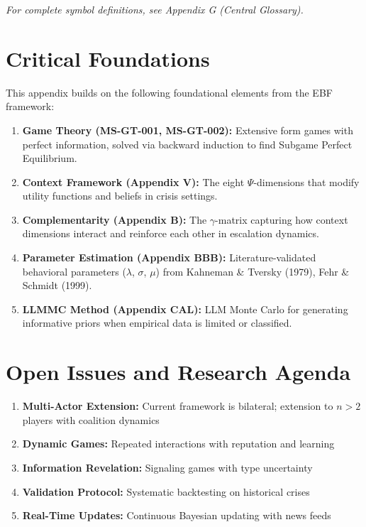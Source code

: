 \vspace{5mm}
\textit{For complete symbol definitions, see Appendix G (Central Glossary).}



\section{Critical Foundations}
\label{sec:crisis-foundations}

This appendix builds on the following foundational elements from the EBF framework:

\begin{enumerate}
\item \textbf{Game Theory (MS-GT-001, MS-GT-002):} Extensive form games with perfect information, solved via backward induction to find Subgame Perfect Equilibrium.

\item \textbf{Context Framework (Appendix V):} The eight $\Psi$-dimensions that modify utility functions and beliefs in crisis settings.

\item \textbf{Complementarity (Appendix B):} The $\gamma$-matrix capturing how context dimensions interact and reinforce each other in escalation dynamics.

\item \textbf{Parameter Estimation (Appendix BBB):} Literature-validated behavioral parameters ($\lambda$, $\sigma$, $\mu$) from Kahneman \& Tversky (1979), Fehr \& Schmidt (1999).

\item \textbf{LLMMC Method (Appendix CAL):} LLM Monte Carlo for generating informative priors when empirical data is limited or classified.
\end{enumerate}



\section{Open Issues and Research Agenda}
\label{sec:crisis-open}

\begin{enumerate}
\item \textbf{Multi-Actor Extension:} Current framework is bilateral; extension to $n > 2$ players with coalition dynamics
\item \textbf{Dynamic Games:} Repeated interactions with reputation and learning
\item \textbf{Information Revelation:} Signaling games with type uncertainty
\item \textbf{Validation Protocol:} Systematic backtesting on historical crises
\item \textbf{Real-Time Updates:} Continuous Bayesian updating with news feeds
\end{enumerate}


